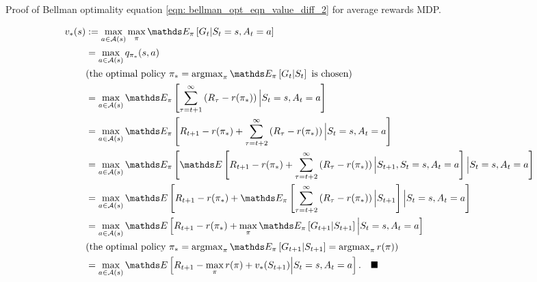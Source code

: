\documentclass[11pt]{article}
\begin{document}
\begin{exercise} Proof of Bellman optimality equation \eqref{eqn: bellman_opt_eqn_value_diff_2} for average rewards MDP. 
\end{exercise}
\begin{solution}
\begin{align*}
v_{*}(s) &:= \max_{a\in \cA(s)}\max_{\pi}\E{\pi}{G_{t}|S_{t}=s, A_{t} = a}\\
&=\max_{a\in \cA(s)}q_{\pi_{*}}(s, a)\\
&(\text{the optimal policy }\pi_{*}=\argmax_{\pi}\E{\pi}{G_{t}|S_{t}}\text{ is chosen}) \\
&=\max_{a\in \cA(s)}\E{\pi}{\sum_{\tau=t+1}^{\infty}\paren{R_{\tau} - r(\pi_{*})} \Big| S_{t}=s, A_{t} = a}\\
&=\max_{a\in \cA(s)}\E{\pi}{R_{t+1} - r(\pi_{*}) + \sum_{\tau=t+2}^{\infty}\paren{R_{\tau} - r(\pi_{*})} \Big| S_{t}=s, A_{t} = a}\\
&= \max_{a\in \cA(s)}\E{\pi}{\E{}{R_{t+1} - r(\pi_{*}) + \sum_{\tau=t+2}^{\infty}\paren{R_{\tau} -r(\pi_{*})}\Big| S_{t+1}, S_{t}=s, A_{t} = a}  \Big| S_{t}=s, A_{t} = a}\\
&= \max_{a\in \cA(s)}\E{}{R_{t+1} - r(\pi_{*}) + \E{\pi}{\sum_{\tau=t+2}^{\infty}\paren{R_{\tau} - r(\pi_{*})}\Big| S_{t+1}}  \Big| S_{t}=s, A_{t} = a}\\
&= \max_{a\in \cA(s)}\E{}{R_{t+1} - r(\pi_{*}) + \max_{\pi}\E{\pi}{G_{t+1}|S_{t+1}}  \Big| S_{t}=s, A_{t} = a}\\
&(\text{the optimal policy }\pi_{*}=\argmax_{\pi}\E{\pi}{G_{t+1}|S_{t+1}} = \argmax_{\pi}r(\pi)) \\
&=\max_{a\in \cA(s)}\E{}{R_{t+1} - \max_{\pi}r(\pi) + v_{*}(S_{t+1})  \Big| S_{t}=s, A_{t} = a}. \quad \QEDA
\end{align*} 
\end{solution}
%
\newpage


\end{document}
